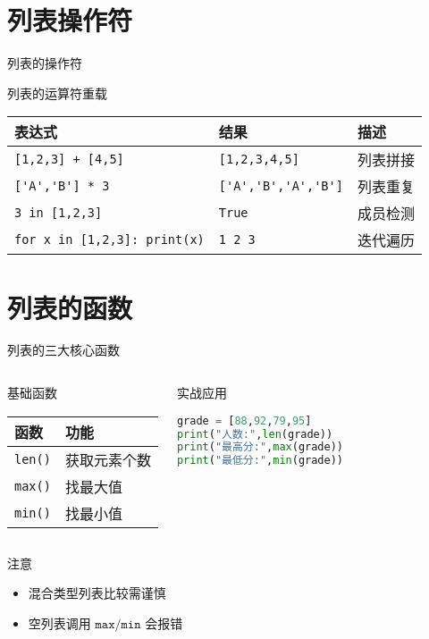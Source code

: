 \documentclass{beamer}
\begin{document}
\section{列表操作符}
\begin{frame}[fragile]{列表的操作符}
\begin{block}{列表的运算符重载}
\begin{tabular}{|l|l|p{2cm}|}
\hline
\textcolor{cuhksz1}{表达式} & \textcolor{cuhksz1}{结果} & \textcolor{cuhksz1}{描述} \\ \hline
\lstinline|[1,2,3] + [4,5]| & \lstinline|[1,2,3,4,5]| & 列表拼接\\ \hline
\lstinline|['A','B'] * 3| & \lstinline|['A','B','A','B']| & 列表重复\\ \hline
\lstinline|3 in [1,2,3]| & \lstinline|True| & 成员检测\\ \hline
\lstinline|for x in [1,2,3]: print(x)| & \lstinline|1 2 3| & 迭代遍历\\ \hline
\end{tabular}
\end{block}
\end{frame}

\section{列表的函数}
\begin{frame}[fragile]{列表的三大核心函数}
\begin{columns}[T]
\begin{block}{基础函数}
\begin{tabular}{|l|l|}
\hline
\textcolor{cuhksz2}{函数} & \textcolor{cuhksz2}{功能} \\ \hline
\lstinline|len()| & 获取元素个数 \\ \hline
\lstinline|max()| & 找最大值 \\ \hline
\lstinline|min()| & 找最小值 \\ \hline
\end{tabular}
\end{block}

\begin{exampleblock}{实战应用}
\begin{lstlisting}[language=Python]
grade = [88,92,79,95]
print("人数:",len(grade))
print("最高分:",max(grade))
print("最低分:",min(grade))
\end{lstlisting}
\end{exampleblock}
\end{columns}

\begin{alertblock}{注意}
\begin{itemize}
\item 混合类型列表比较需谨慎
\item 空列表调用 $\texttt{max/min}$ 会报错
\end{itemize}
\end{alertblock}
\end{frame}
\end{document}
